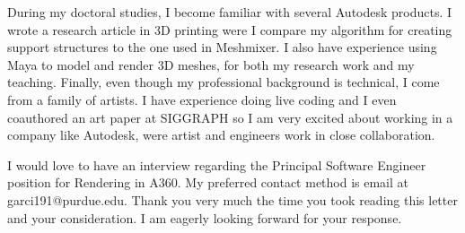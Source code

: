 \documentclass[10pt,stdletter,dateno,sigleft,letterpaper]{newlfm} %
\begin{document}
\begin{newlfm}

During my doctoral studies, I become familiar with several Autodesk products. I wrote a research article in 3D printing were I compare my algorithm for creating support structures to the one used in Meshmixer. I also have experience using Maya to model and render 3D meshes, for both my research work and my teaching. Finally, even though my professional background is technical, I come from a family of artists. I have experience doing live coding and I even coauthored an art paper at SIGGRAPH so I am very excited about working in a company like Autodesk, were artist and engineers work in close collaboration.


I would love to have an interview regarding the Principal Software Engineer position for Rendering in A360. My preferred contact method is email at garci191@purdue.edu. Thank you very much the time you took reading this letter and your consideration. I am eagerly looking forward for your response.


\end{newlfm}
\end{document}
